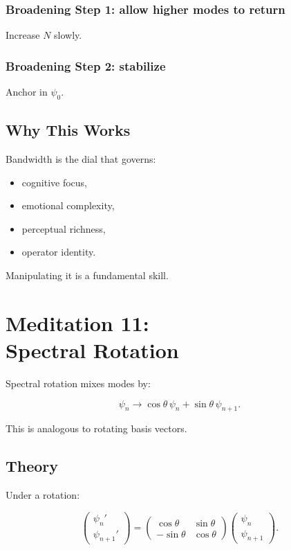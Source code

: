\documentclass[12pt]{article}
\begin{document}
\subsection*{Broadening Step 1: allow higher modes to return}

Increase $N$ slowly.

\subsection*{Broadening Step 2: stabilize}

Anchor in $\psi_0$.

\section{Why This Works}

Bandwidth is the dial that governs:

\begin{itemize}
    \item cognitive focus,
    \item emotional complexity,
    \item perceptual richness,
    \item operator identity.
\end{itemize}

Manipulating it is a fundamental skill.

\newpage

\chapter{Meditation 11:\\ Spectral Rotation}

Spectral rotation mixes modes by:

\[
\psi_n \to \cos\theta\,\psi_n + \sin\theta\,\psi_{n+1}.
\]

This is analogous to rotating basis vectors.

\section{Theory}

Under a rotation:

\[
\begin{pmatrix}
\psi_n' \\
\psi_{n+1}'
\end{pmatrix}
=
\begin{pmatrix}
\cos\theta & \sin\theta \\
-\sin\theta & \cos\theta
\end{pmatrix}
\begin{pmatrix}
\psi_n \\
\psi_{n+1}
\end{pmatrix}.
\]
\end{document}
